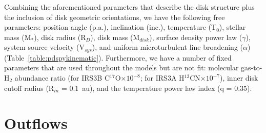 \documentclass[twocolumn, 12pt]{aastex63}
\newcommand{\htcn}{H$^{13}$CN}
\newcommand{\cso}{C$^{17}$O}
\begin{document}
Combining the aforementioned parameters that describe the disk structure plus the inclusion of disk geometric orientations, we have the following free parameters:  position angle (p.a.), inclination (inc.), temperature (T$_0$), stellar mass (M$_{*}$), disk radius (R$_D$), disk mass (M$_{disk}$), surface density power law ($\gamma$), system source velocity (V$_{sys}$), and uniform microturbulent line broadening ($\alpha$) (Table~\ref{table:pdspykinematic}). Furthermore, we have a number of fixed parameters that are used throughout the models but are not fit: molecular gas-to-H$_{2}$ abundance ratio (for IRS3B \cso{}$\times10^{-8}$; for IRS3A \htcn{}$\times10^{-7}$), inner disk cutoff radius (R$_{in}$ = 0.1~au), and the temperature power law index (q = 0.35).



\section{Outflows}\label{sec:outflow}
\end{document}
